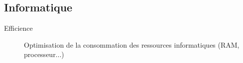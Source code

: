 \subsection{Informatique}

\begin{description}
  \item[Efficience] Optimisation de la consommation des ressources informatiques (RAM, processeur...) 
\end{description}


    
